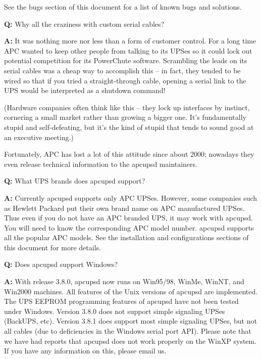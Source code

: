{{{{{{{{{\label{index-FAQ-147}
See the bugs section of this document for a list of known bugs and solutions. 


\begin{description}

\item {\bf 
\label{crazy}
Q:}
Why all the craziness with custom serial cables?  

\item {\bf A:}
It was nothing more nor less than a form of customer control. For a long time
APC wanted to keep other people from talking to its UPSes so it could lock out
potential competition for its PowerChute software.  Scrambling the leads on
its serial cables was a cheap way to accomplish this {--} in fact, they tended
to be wired so that if you tried a straight-through cable, opening a serial
link to the UPS would be interpreted as a shutdown command!  

(Hardware companies often think like this {--} they lock up interfaces by
instinct, cornering a small market rather than growing a bigger one.  It's
fundamentally stupid and self-defeating, but it's the kind of stupid that
tends to sound good at an executive meeting.)  

Fortunately, APC has lost a lot of this attitude since about 2000; nowadays
they even release technical information to the apcupsd maintainers.  

\item {\bf Q:}
What UPS brands does apcupsd support?  

\item {\bf A:}
Currently apcupsd supports only APC UPSes. However, some companies such as
Hewlett Packard put their own brand name on APC manufactured UPSes. Thus even
if you do not have an APC branded UPS, it may work with apcupsd. You will need
to know the corresponding APC model number. apcupsd supports all the popular
APC models. See the installation and configurations sections of this document
for more details.  

\item {\bf Q:}
Does apcupsd support Windows?  

\item {\bf A:}
With release 3.8.0, apcupsd now runs on Win95/98, WinMe, WinNT, and Win2000
machines. All features of the Unix versions of apcupsd are implemented. The
UPS EEPROM programming features of apcupsd have not been tested under Windows.
Version 3.8.0 does not support simple signaling UPSes (BackUPS, etc). Version
3.8.1 does support most simple signaling UPSes, but not all cables (due to
deficiencies in the Windows serial port API). Please note that we have had
reports that apcupsd does not work properly on the WinXP system. If you have
any information on this, please email us.  


\end{description}}}}}}}}}}
